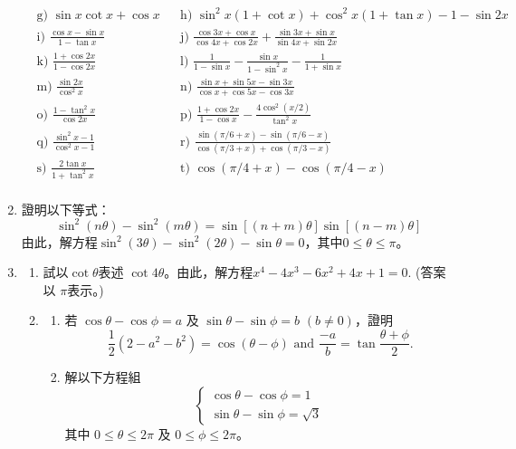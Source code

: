 \documentclass[12pt]{article}
\begin{document}
\begin{enumerate}
\begin{align*}
            &\textrm{g) } \sin{x}\cot{x}+\cos{x} && \textrm{h) } \sin^2{x}(1+\cot{x})+\cos^2{x}(1+\tan{x})-1-\sin{2x}\\
            &\textrm{i) } \frac{\cos{x}-\sin{x}}{1-\tan{x}} && \textrm{j) } \frac{\cos{3x}+\cos{x}}{\cos{4x}+\cos{2x}}+\frac{\sin{3x}+\sin{x}}{\sin{4x}+\sin{2x}}\\
            &\textrm{k) } \frac{1+\cos{2x}}{1-\cos{2x}} && \textrm{l) } \frac{1}{1-\sin{x}}-\frac{\sin{x}}{1-\sin^2{x}}-\frac{1}{1+\sin{x}}\\
            &\textrm{m) } \frac{\sin{2x}}{\cos^2{x}} && \textrm{n) } \frac{\sin{x}+\sin{5x}-\sin{3x}}{\cos{x}+\cos{5x}-\cos{3x}}\\
            &\textrm{o) } \frac{1-\tan^2{x}}{\cos{2x}} && \textrm{p) } \frac{1+\cos{2x}}{1-\cos{x}}-\frac{4\cos^2{(x/2)}}{\tan^2{x}}\\
            &\textrm{q) } \frac{\sin^2{x}-1}{\cos^2{x}-1} && \textrm{r) } \frac{\sin(\pi/6+x)-\sin(\pi/6-x)}{\cos(\pi/3+x)+\cos(\pi/3-x)}\\
            &\textrm{s) } \frac{2\tan{x}}{1+\tan^2{x}} && \textrm{t) } \cos(\pi/4+x)-\cos(\pi/4-x)\\
        \end{align*}
        \item 證明以下等式：$$\sin^2(n\theta)-\sin^2(m\theta)=\sin[(n+m)\theta]\sin[(n-m)\theta]$$由此，解方程$\sin^2(3\theta)-\sin^2(2\theta)-\sin{\theta}=0$，其中$0\leq \theta\leq \pi$。
        \item \begin{enumerate}
            \item 試以$\cot{\theta}$表述 $\cot{4\theta}$。由此，解方程$x^4-4x^3-6x^2+4x+1=0$. (答案以 $\pi$表示。)
            \item \begin{enumerate}
                \item 若 $\cos{\theta}-\cos{\phi}=a$ 及 $\sin{\theta}-\sin{\phi}=b$ $(b\neq 0)$，證明 $$\frac{1}{2}(2-a^2-b^2)=\cos{(\theta-\phi)}\textrm{ and }\frac{-a}{b}=\tan{\frac{\theta+\phi}{2}}.$$
                \item 解以下方程組 $$\begin{cases}
                    \cos{\theta}-\cos{\phi}=1\\
                    \sin{\theta}-\sin{\phi}=\sqrt{3}
                \end{cases}$$
                其中 $0\leq \theta \leq 2\pi$ 及 $0\leq \phi \leq 2\pi$。
            \end{enumerate}

\end{enumerate}
\end{enumerate}
\end{document}
